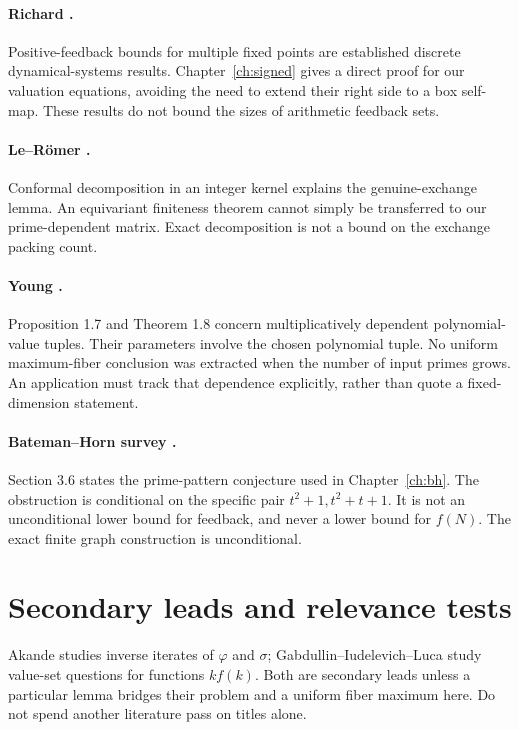 \paragraph{Richard \cite{richard2009,richard2022}.}
Positive-feedback bounds for multiple fixed points are established discrete
dynamical-systems results. Chapter~\ref{ch:signed} gives a direct proof for our
valuation equations, avoiding the need to extend their right side to a box
self-map. These results do not bound the sizes of arithmetic feedback sets.

\paragraph{Le--R\"omer \cite{graver}.}
Conformal decomposition in an integer kernel explains the genuine-exchange
lemma. An equivariant finiteness theorem cannot simply be transferred to our
prime-dependent matrix. Exact decomposition is not a bound on the exchange
packing count.

\paragraph{Young \cite{young}.}
Proposition 1.7 and Theorem 1.8 concern multiplicatively dependent polynomial-value
tuples. Their parameters involve the chosen polynomial tuple. No uniform
maximum-fiber conclusion was extracted when the number of input primes grows.
An application must track that dependence explicitly, rather than quote a
fixed-dimension statement.

\paragraph{Bateman--Horn survey \cite{bh}.}
Section 3.6 states the prime-pattern conjecture used in Chapter~\ref{ch:bh}.
The obstruction is conditional on the specific pair $t^2+1,t^2+t+1$.
It is not an unconditional lower bound for feedback, and never a lower bound
for $f(N)$. The exact finite graph construction is unconditional.

\section{Secondary leads and relevance tests}
Akande \cite{akande} studies inverse iterates of $\varphi$ and $\sigma$;
Gabdullin--Iudelevich--Luca \cite{gil} study value-set questions for functions
$kf(k)$. Both are secondary leads unless a particular lemma bridges their
problem and a uniform fiber maximum here. Do not spend another literature pass
on titles alone.

